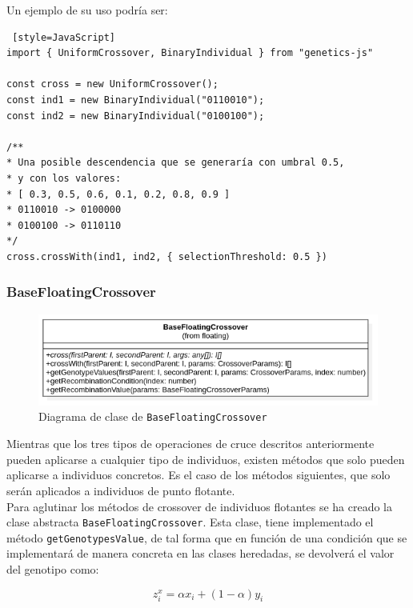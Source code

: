 Un ejemplo de su uso podría ser: \\

\begin{lstlisting} [style=JavaScript]
import { UniformCrossover, BinaryIndividual } from "genetics-js"

const cross = new UniformCrossover();
const ind1 = new BinaryIndividual("0110010");
const ind2 = new BinaryIndividual("0100100");

/**
* Una posible descendencia que se generaría con umbral 0.5,
* y con los valores:
* [ 0.3, 0.5, 0.6, 0.1, 0.2, 0.8, 0.9 ]
* 0110010 -> 0100000
* 0100100 -> 0110110
*/
cross.crossWith(ind1, ind2, { selectionThreshold: 0.5 })
\end{lstlisting}


\subsubsection{BaseFloatingCrossover}

\begin{figure}[ht]
    \centering
    \includegraphics[scale=0.5]{mem/images/cap-4/4.2.6(Crossover)/BaseFloating.png}
    \caption{Diagrama de clase de \texttt{BaseFloatingCrossover}}
    \label{fig:my_label}
\end{figure}

Mientras que los tres tipos de operaciones de cruce descritos anteriormente pueden aplicarse a cualquier tipo de individuos, existen métodos que solo pueden aplicarse a individuos concretos. Es el caso de los métodos siguientes, que solo serán aplicados a individuos de punto flotante. \\

Para aglutinar los métodos de crossover de individuos flotantes \cite{michalewicz2013genetic} se ha creado la clase abstracta \texttt{BaseFloatingCrossover}. Esta clase, tiene implementado el método \texttt{getGenotypesValue}, de tal forma que en función de una condición que se implementará de manera concreta en las clases heredadas, se devolverá el valor del genotipo como: 

\begin{equation}
    z^x_i = \alpha x_i + (1 - \alpha)y_i
\end{equation}


